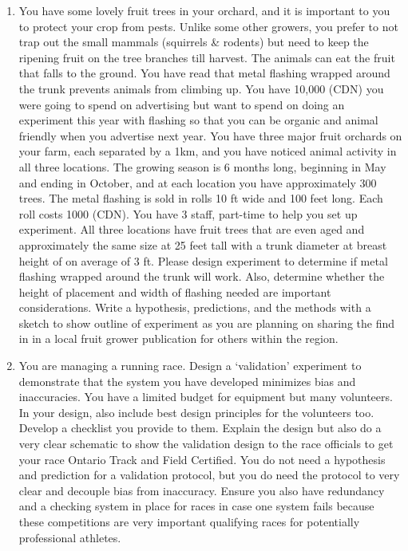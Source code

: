 \documentclass[
]{book}
\begin{document}
\begin{enumerate}
\def\labelenumi{\arabic{enumi}.}
\item
  You have some lovely fruit trees in your orchard, and it is important to you to protect your crop from pests. Unlike some other growers, you prefer to not trap out the small mammals (squirrels \& rodents) but need to keep the ripening fruit on the tree branches till harvest. The animals can eat the fruit that falls to the ground. You have read that metal flashing wrapped around the trunk prevents animals from climbing up. You have 10,000 (CDN) you were going to spend on advertising but want to spend on doing an experiment this year with flashing so that you can be organic and animal friendly when you advertise next year. You have three major fruit orchards on your farm, each separated by a 1km, and you have noticed animal activity in all three locations. The growing season is 6 months long, beginning in May and ending in October, and at each location you have approximately 300 trees. The metal flashing is sold in rolls 10 ft wide and 100 feet long. Each roll costs 1000 (CDN). You have 3 staff, part-time to help you set up experiment. All three locations have fruit trees that are even aged and approximately the same size at 25 feet tall with a trunk diameter at breast height of on average of 3 ft. Please design experiment to determine if metal flashing wrapped around the trunk will work. Also, determine whether the height of placement and width of flashing needed are important considerations. Write a hypothesis, predictions, and the methods with a sketch to show outline of experiment as you are planning on sharing the find in in a local fruit grower publication for others within the region.
\item
  You are managing a running race. Design a `validation' experiment to demonstrate that the system you have developed minimizes bias and inaccuracies. You have a limited budget for equipment but many volunteers. In your design, also include best design principles for the volunteers too. Develop a checklist you provide to them. Explain the design but also do a very clear schematic to show the validation design to the race officials to get your race Ontario Track and Field Certified. You do not need a hypothesis and prediction for a validation protocol, but you do need the protocol to very clear and decouple bias from inaccuracy. Ensure you also have redundancy and a checking system in place for races in case one system fails because these competitions are very important qualifying races for potentially professional athletes.

\end{enumerate}
\end{document}
